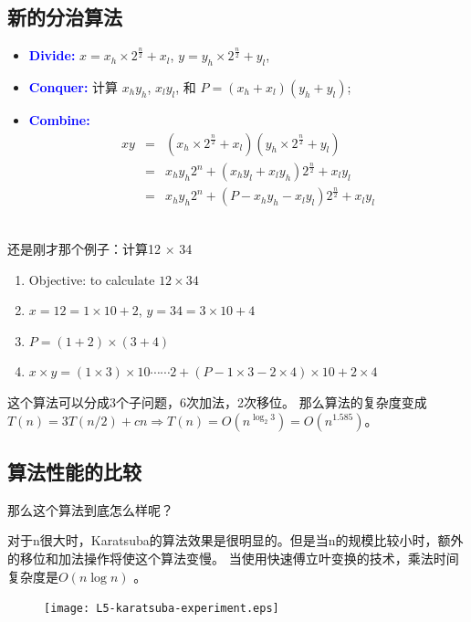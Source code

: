 \subsection{新的分治算法}

\begin{itemize}
 \item \textcolor{blue}{\bf Divide:} $x=x_h \times 2^{\frac{n}{2}} + x_l$, $y=y_h \times 2^{\frac{n}{2}} + y_l$, 
 \item \textcolor{blue}{\bf Conquer:} 计算 $x_h y_h$, $x_l y_l$, 和 $P=(x_h + x_l) (y_h + y_l)$;  
 \item \textcolor{blue}{\bf Combine:} \begin{eqnarray}
                 xy &=& (x_h \times 2^{\frac{n}{2}} + x_l) (y_h \times 2^{\frac{n}{2}} + y_l) \\
                    &=& x_hy_h 2^n + ( x_hy_l + x_ly_h) 2^{\frac{n}{2}} + x_l y_l \\
		    &=& x_hy_h 2^n + ( P - x_hy_h - x_l y_l) 2^{\frac{n}{2}} + x_l y_l 
                \end{eqnarray} \\
\end{itemize}


	还是刚才那个例子：计算12 × 34
\begin{enumerate}
	\item	Objective: to calculate $12 \times 34 $
	\item $x=12 = 1 \times 10 + 2$, $y=34=3 \times 10 +4$
	\item $P=(1 + 2)\times(3 + 4)$ 
	\item $x\times y = (1\times 3)\times 10⋯⋯2 + ( P - 1\times3 - 2 \times 4)  \times 10 + 2\times 4 $
\end{enumerate}
	这个算法可以分成3个子问题，6次加法，2次移位。
那么算法的复杂度变成$T(n)=3T(n/2) + cn \Rightarrow T(n)=O(n^{\log_2 3}) = O(n^{1.585})$。

\subsection{算法性能的比较}
	那么这个算法到底怎么样呢？
	
	对于n很大时，Karatsuba的算法效果是很明显的。但是当n的规模比较小时，额外的移位和加法操作将使这个算法变慢。	当使用快速傅立叶变换的技术，乘法时间复杂度是$O(n\log n)$ 。 
\begin{figure}[H]
\centering
 		\texttt{[image: L5-karatsuba-experiment.eps]}
\end{figure}


